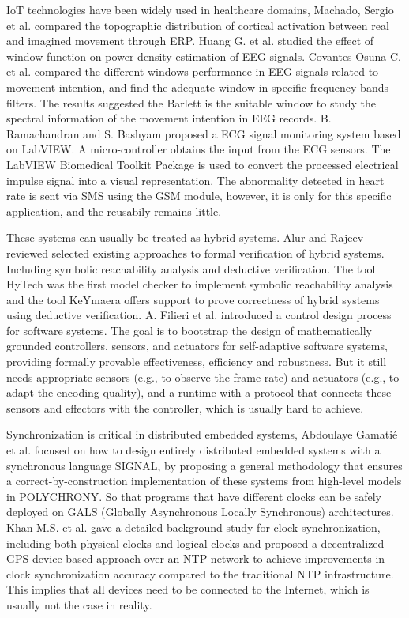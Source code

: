 \documentclass[11pt, oneside]{article}   	%
\begin{document}
\indent \par IoT technologies have been widely used in healthcare domains, Machado, Sergio et al. \cite{ref2} compared the topographic distribution of cortical activation between real and imagined movement through ERP. Huang G. et al. \cite{ref3} studied the effect of window function on power density estimation of EEG signals. Covantes-Osuna C. et al. \cite{ref4} compared the different windows performance in EEG signals related to movement intention, and find the adequate window in specific frequency bands filters. The results suggested the Barlett is the suitable window to study the spectral information of the movement intention in EEG records. B. Ramachandran and S. Bashyam \cite{ref11} proposed a ECG signal monitoring system based on LabVIEW. A micro-controller obtains the input from the ECG sensors. The LabVIEW Biomedical Toolkit Package is used to convert the processed electrical impulse signal into a visual representation. The abnormality detected in heart rate is sent via SMS using the GSM module, however, it is only for this specific application, and the reusabily remains little.\par


\indent \par These systems can usually be treated as hybrid systems. Alur and Rajeev  \cite{ref8} reviewed selected existing approaches to formal verification of hybrid systems. Including symbolic reachability analysis and deductive verification. The tool HyTech was the ﬁrst model checker to implement symbolic reachability analysis and the tool KeYmaera oﬀers support to prove correctness of hybrid systems using deductive veriﬁcation. A. Filieri et al. \cite{ref10} introduced a control design process for software systems. The goal is to bootstrap the design of mathematically grounded controllers, sensors, and actuators for self-adaptive software systems, providing formally provable effectiveness, efficiency and robustness. But it still needs appropriate sensors (e.g., to observe the frame rate) and actuators (e.g., to adapt the encoding quality), and a runtime with a protocol that connects these sensors and effectors with the controller, which is usually hard to achieve. \par

	
\indent \par Synchronization is critical in distributed embedded systems, Abdoulaye Gamatié et al. \cite{ref7} focused on how to design entirely distributed embedded systems with a synchronous language SIGNAL, by proposing a general methodology that ensures a correct-by-construction implementation of these systems from high-level models in POLYCHRONY. So that programs that have different clocks can be safely deployed on GALS (Globally Asynchronous Locally Synchronous) architectures. Khan M.S. et al. \cite{ref12} gave a detailed background study for clock synchronization, including both physical clocks and logical clocks and proposed a decentralized GPS device based approach over an NTP network to achieve improvements in clock synchronization accuracy compared to the traditional NTP infrastructure. This implies that all devices need to be connected to the Internet, which is usually not the case in reality.\par
\end{document}
